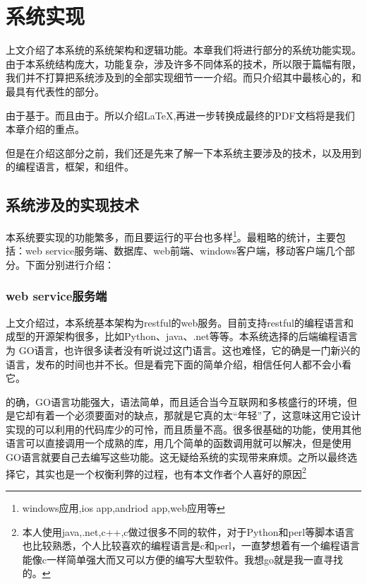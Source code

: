 
\chapter{系统实现}
\label{chap:achieve}

上文介绍了本系统的系统架构和逻辑功能。本章我们将进行部分的系统功能实现。由于本系统结构庞大，功能复杂，涉及许多不同体系的技术，所以限于篇幅有限，我们并不打算把系统涉及到的全部实现细节一一介绍。而只介绍其中最核心的，和最具有代表性的部分。

由于基于。而且由于。所以介绍\LaTeX,再进一步转换成最终的PDF文档将是我们本章介绍的重点。

但是在介绍这部分之前，我们还是先来了解一下本系统主要涉及的技术，以及用到的编程语言，框架，和组件。

\section{系统涉及的实现技术}
\label{sec:language}

本系统要实现的功能繁多，而且要运行的平台也多样\footnote{windows应用,ios app,andriod app,web应用等}。最粗略的统计，主要包括：web service服务端、数据库、web前端、windows客户端，移动客户端几个部分。下面分别进行介绍：

\subsection{web service服务端}
\label{sec:webservice}

上文介绍过，本系统基本架构为restful的web服务。目前支持restful的编程语言和成型的开源架构很多，比如Python、java、.net等等。本系统选择的后端编程语言为 GO语言，也许很多读者没有听说过这门语言。这也难怪，它的确是一门新兴的语言，发布的时间也并不长。但是看完下面的简单介绍，相信任何人都不会小看它。


的确，GO语言功能强大，语法简单，而且适合当今互联网和多核盛行的环境，但是它却有着一个必须要面对的缺点，那就是它真的太“年轻”了，这意味这用它设计实现的可以利用的代码库少的可怜，而且质量不高。很多很基础的功能，使用其他语言可以直接调用一个成熟的库，用几个简单的函数调用就可以解决，但是使用GO语言就要自己去编写这些功能。这无疑给系统的实现带来麻烦。之所以最终选择它，其实也是一个权衡利弊的过程，也有本文作者个人喜好的原因\footnote{本人使用java,.net,c++,c做过很多不同的软件，对于Python和perl等脚本语言也比较熟悉，个人比较喜欢的编程语言是c和perl，一直梦想着有一个编程语言能像c一样简单强大而又可以方便的编写大型软件。我想go就是我一直寻找的。}